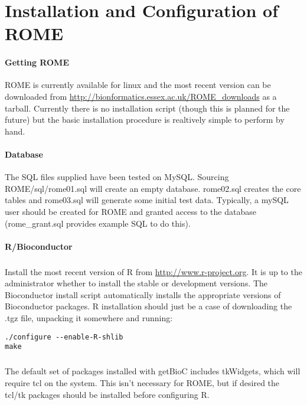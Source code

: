 \chapter{Installation and Configuration of ROME}
\label{sec:install}
\subsubsection{Getting ROME}
ROME is currently available for linux and the most recent version can be downloaded from \url{http://bionformatics.essex.ac.uk/ROME_downloads} as a tarball. Currently there is no installation script (though this is planned for the future) but the basic installation procedure is realtively simple to perform by hand.

\subsubsection{Database}
The SQL files supplied have been tested on MySQL. Sourcing ROME/sql/rome01.sql will create an empty database. rome02.sql creates the core tables and rome03.sql will generate some initial test data. Typically, a mySQL user should be created for ROME and granted access to the database (rome\_grant.sql provides example SQL to do this).




\subsubsection{R/Bioconductor}

\paragraph{}
Install the most recent version of R from \url{http://www.r-project.org}. It is up to the administrator whether to install the stable or development versions. The Bioconductor install script automatically installs the appropriate versions of Bioconductor packages. R installation should just be a case of downloading the .tgz file, unpacking it somewhere and running: 

\begin{verbatim}
./configure --enable-R-shlib
make 
\end{verbatim}

\paragraph{}
The default set of packages installed with getBioC includes tkWidgets, which will require tcl on the system. This isn't necessary for ROME, but if desired the tcl/tk packages should be installed before configuring R.


